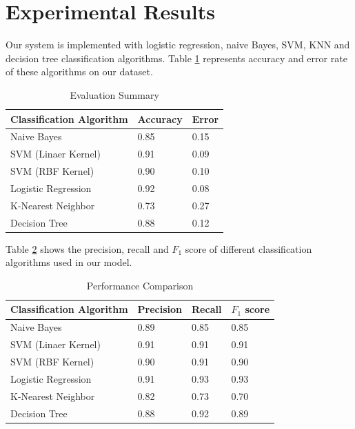 \section{\textbf{Experimental Results}}
Our system is implemented with logistic regression, naive Bayes, SVM,  KNN and decision tree classification algorithms. Table \ref{AE} represents accuracy and error rate of these algorithms on our dataset.
\renewcommand{\arraystretch}{1.5}
\begin{table}[h!]
\begin{center}
\caption{Evaluation Summary}
\begin{tabular}{||m{4.5cm} | m{1.6cm}| m{1.6cm}||}
\hline
     Classification Algorithm & Accuracy  & Error  \\
\hline
    Naive Bayes & 0.85 & 0.15\\
\hline 
    SVM (Linaer Kernel) & 0.91 & 0.09\\
\hline 
    SVM (RBF Kernel) & 0.90 & 0.10\\
\hline 
    Logistic Regression & 0.92 & 0.08\\
\hline
    K-Nearest Neighbor & 0.73 & 0.27\\
\hline
    Decision Tree & 0.88 & 0.12\\
\hline
\end{tabular}
\label{AE}
\end{center}
\end{table}
\par
Table \ref{prr} shows the precision, recall and $F_1$ score of different classification algorithms used in our model.

\begin{table}[h!]
\begin{center}
\caption{Performance Comparison}
\begin{tabular}{||m{3.6cm} | m{1.25cm}| m{1.2cm}| m{1.3cm}||}
\hline
     Classification Algorithm & Precision & Recall & $F_1$ score \\
\hline
    Naive Bayes & 0.89 & 0.85 & 0.85\\
\hline 
    SVM (Linaer Kernel) & 0.91 & 0.91 & 0.91\\
\hline 
    SVM (RBF Kernel) & 0.90 & 0.91 & 0.90\\
\hline 
    Logistic Regression & 0.91 & 0.93 & 0.93\\
\hline
    K-Nearest Neighbor & 0.82 & 0.73 & 0.70\\
\hline
    Decision Tree & 0.88 & 0.92 & 0.89\\
\hline
\end{tabular}
\label{prr}
\end{center}
\end{table}

